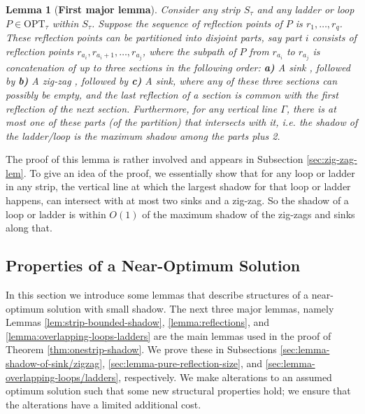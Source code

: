 \documentclass[10pt,a4paper]{amsart}
\theoremstyle{thmstyleone}
\newtheorem{lemma}{Lemma}
\newcommand{\OPT}{{\text{OPT}}}
\begin{document}
\begin{lemma}[\bf First major lemma]\label{lemma:zig-zag}
    Consider any strip $S_\tau$ and any ladder or loop $P\in \OPT_\tau$ within $S_\tau$. Suppose the sequence of reflection points of $P$ is $r_1,\ldots,r_q$.
    These reflection points can be partitioned into disjoint parts, say part
    $i$ consists of reflection points $r_{a_i},r_{a_i+1},\ldots,r_{a_j}$,
    where the subpath of $P$ from $r_{a_i}$ to $r_{a_j}$ is concatenation of up to three sections in the following order:
   \textbf{a)} 
    A sink
   , followed by
   \textbf{b)} 
    A zig-zag
   , followed by
   \textbf{c)} 
    A sink,
    where any of these three sections can possibly be empty, and the last reflection of a section is common with  the first reflection of the next section.
    Furthermore, for any vertical line $\Gamma$, there is at most one of these parts (of the partition) that intersects with it, i.e. the shadow of the ladder/loop is the maximum shadow among the parts plus 2.
\end{lemma}

The proof of this lemma is rather involved and appears in Subsection \ref{sec:zig-zag-lem}.
To give an idea of the proof, we essentially show that for any loop or ladder in any strip, the vertical line at which the largest shadow for that loop or ladder happens, can intersect with at most two sinks and a zig-zag. So the shadow of a loop or ladder is within $O(1)$ of the maximum shadow of the zig-zags and sinks along that. 


\subsection{Properties of a Near-Optimum Solution}
\label{sec:near-optimum-property}
In this section we introduce some lemmas that describe structures of a near-optimum solution with small shadow. The next three major lemmas, namely Lemmas
\ref{lem:strip-bounded-shadow}, \ref{lemma:reflections}, and \ref{lemma:overlapping-loops-ladders} are the main lemmas used in the proof of Theorem \ref{thm:onestrip-shadow}. 
We prove these in Subsections \ref{sec:lemma-shadow-of-sink/zigzag}, \ref{sec:lemma-pure-reflection-size}, and \ref{sec:lemma-overlapping-loops/ladders}, respectively. We make alterations to an assumed optimum solution such that some new structural properties hold; we ensure that the alterations have a limited additional cost.
\end{document}
